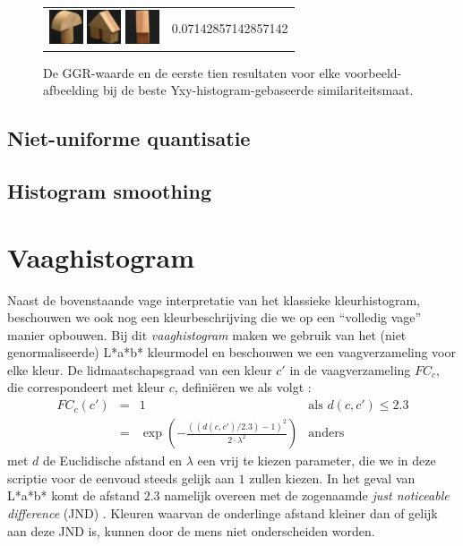 \begin{figure}[tbp]
\begin{center}
\begin{tabular}{m{11cm} | m{3cm} |}
\includegraphics[width=1cm]{coil/beeld-3.eps}
\includegraphics[width=1cm]{coil/beeld-46.eps}
\includegraphics[width=1cm]{coil/beeld-44.eps}
& {\scriptsize 0.07142857142857142}
\end{tabular}
\caption{\label{fig:results_yxy_histgeb}De GGR-waarde en de eerste tien resultaten voor elke voorbeeld-afbeelding bij de beste Yxy-histogram-gebaseerde similariteitsmaat.}
\end{center}
\end{figure}


\subsection{Niet-uniforme quantisatie}

\subsection{Histogram smoothing}


\section{Vaaghistogram}

Naast de bovenstaande vage interpretatie van het klassieke kleurhistogram, beschouwen we
ook nog een kleurbeschrijving die we op een ``volledig vage'' manier opbouwen. Bij dit
\emph{vaaghistogram} maken we gebruik van het (niet genormaliseerde) L*a*b* kleurmodel en 
beschouwen we een vaagverzameling voor elke kleur. 
De lidmaatschapsgraad van een kleur $c'$ in de vaagverzameling 
$FC_c$, die correspondeert met kleur $c$, defini\"eren we als volgt \cite{vertan:fuzzy_histograms}: 
$$
\begin{array}{rcll}
FC_c(c') & = & 1 & \textrm{als } d(c,c') \leq 2.3 \\
		 & = & \exp \left( - \frac{\left((d(c,c') / 2.3) - 1\right)^2}{2 \cdot \lambda^2} \right) & \textrm{anders}
\end{array}
$$  
met $d$ de Euclidische afstand en $\lambda$ een vrij te kiezen parameter, die we in deze scriptie
voor de eenvoud steeds gelijk aan $1$ zullen kiezen. In het geval van L*a*b* 
komt de afstand $2.3$ namelijk overeen met de zogenaamde \emph{just noticeable difference} (JND)
\cite{sharma:digital_color_imaging}. 
Kleuren waarvan de onderlinge afstand kleiner dan of gelijk aan deze JND is, kunnen door de mens 
niet onderscheiden worden.

